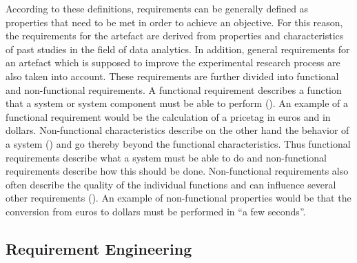 According to these definitions, requirements can be generally defined as properties that need to be met in order to achieve an objective. For this reason, the requirements for the artefact are derived from properties and characteristics of past studies in the field of data analytics. In addition, general requirements for an artefact which is supposed to improve the experimental research process are also taken into account. These requirements are further divided into functional and non-functional requirements. A functional requirement describes a function that a system or system component must be able to perform (\cite{IEEE.1990}). An example of a functional requirement would be the calculation of a pricetag in euros and in dollars. Non-functional characteristics describe on the other hand the behavior of a system (\cite{Seacord.2003}) and go thereby beyond the functional characteristics. Thus functional requirements describe what a system must be able to do and non-functional requirements describe how this should be done. Non-functional requirements also often describe the quality of the individual functions and can influence several other requirements (\cite{Balzert.2011}). An example of non-functional properties would be that the conversion from euros to dollars must be performed in \enquote{a few seconds}.

\subsection{Requirement Engineering}

